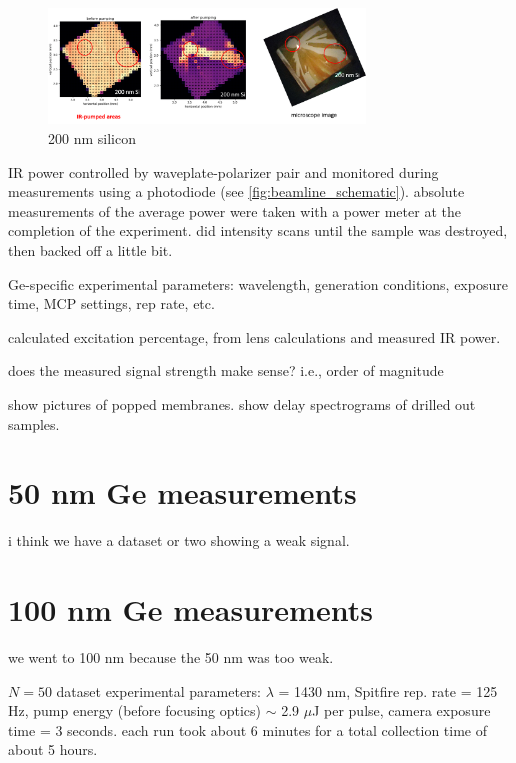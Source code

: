 \begin{figure}
	\centering
	\includegraphics[width=0.75\textwidth]{figures/chap3/Si_damage.png}
	\caption{200 nm silicon}
	\label{fig:Si_damage}
\end{figure}

IR power controlled by waveplate-polarizer pair and monitored during measurements using a photodiode (see \cref{fig:beamline_schematic}). absolute measurements of the average power were taken with a power meter at the completion of the experiment. did intensity scans until the sample was destroyed, then backed off a little bit.


Ge-specific experimental parameters: wavelength, generation conditions, exposure time, MCP settings, rep rate, etc.

calculated excitation percentage, from lens calculations and measured IR power.

does the measured signal strength make sense? i.e., order of magnitude

show pictures of popped membranes. show delay spectrograms of drilled out samples.

\section{50 nm Ge measurements}
i think we have a dataset or two showing a weak signal.


\section{100 nm Ge measurements}
we went to 100 nm because the 50 nm was too weak.

$N=50$ dataset experimental parameters: $\lambda$ = 1430 nm, Spitfire rep. rate = 125 Hz, pump energy (before focusing optics) $\sim$ 2.9 $\mu$J per pulse, camera exposure time = 3 seconds. each run took about 6 minutes for a total collection time of about 5 hours. 

